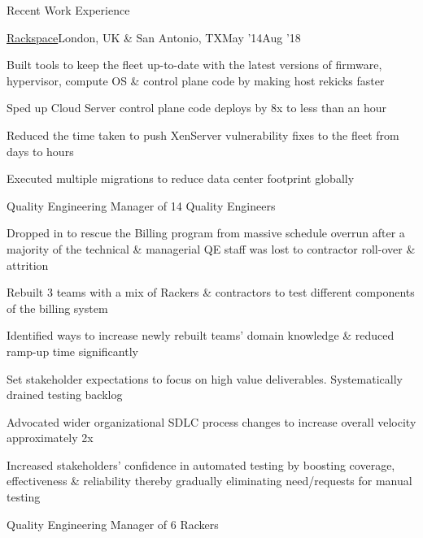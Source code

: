 \documentclass{resume} %
\begin{document}
\begin{rSection}{Recent Work Experience}
\begin{rSubsection}{\href{https://www.rackspace.com/}{Rackspace}}{London, UK \& San Antonio, TX}{May '14}{Aug '18}
    \item Built tools to keep the fleet up-to-date with the latest versions of firmware, hypervisor, compute OS \& control plane code by making host rekicks faster
    \item Sped up Cloud Server control plane code deploys by 8x to less than an hour
    \item Reduced the time taken to push XenServer vulnerability fixes to the fleet from days to hours
    \item Executed multiple migrations to reduce data center footprint globally

\end{rSubsection}\vspace{-1em}

  
\begin{rSubsection}{}{}{}{}
{Quality Engineering Manager of 14 Quality Engineers}
  \item Dropped in to rescue the Billing program from massive schedule overrun after a majority of the technical \& managerial QE staff was lost to contractor roll-over \& attrition
    \item Rebuilt 3 teams with a mix of Rackers \& contractors to test different components of the billing system
  \item Identified ways to increase newly rebuilt teams' domain knowledge \& reduced ramp-up time significantly
\item Set stakeholder expectations to focus on high value deliverables. Systematically drained testing backlog
\item Advocated wider organizational SDLC process changes to increase overall velocity approximately 2x
\item Increased stakeholders' confidence in automated testing by boosting coverage, effectiveness \& reliability thereby gradually eliminating need/requests for manual testing
  
\end{rSubsection}\vspace{-1em}



\begin{rSubsection}{}{}{}{}
{Quality Engineering Manager of 6 Rackers}


\end{rSubsection}
\end{rSection}
\end{document}
